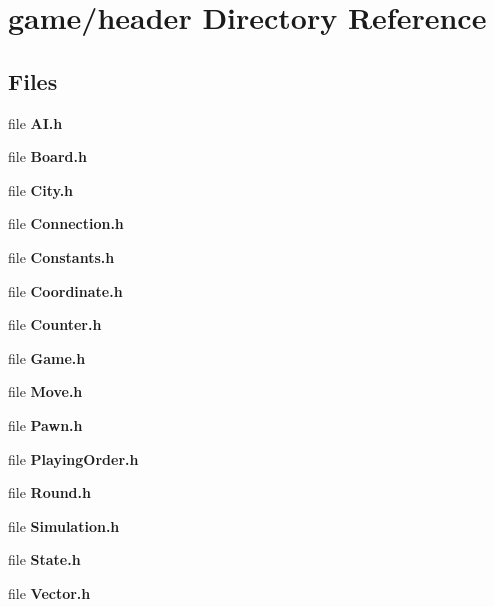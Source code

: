 \section{game/header Directory Reference}
\label{dir_d3306dc36c8202208f23146caa75ae06}
\subsection*{Files}
\begin{DoxyCompactItemize}
\item 
file {\bfseries A\-I.\-h}
\item 
file {\bfseries Board.\-h}
\item 
file {\bfseries City.\-h}
\item 
file {\bfseries Connection.\-h}
\item 
file {\bfseries Constants.\-h}
\item 
file {\bfseries Coordinate.\-h}
\item 
file {\bfseries Counter.\-h}
\item 
file {\bfseries Game.\-h}
\item 
file {\bfseries Move.\-h}
\item 
file {\bfseries Pawn.\-h}
\item 
file {\bfseries Playing\-Order.\-h}
\item 
file {\bfseries Round.\-h}
\item 
file {\bfseries Simulation.\-h}
\item 
file {\bfseries State.\-h}
\item 
file {\bfseries Vector.\-h}
\end{DoxyCompactItemize}
